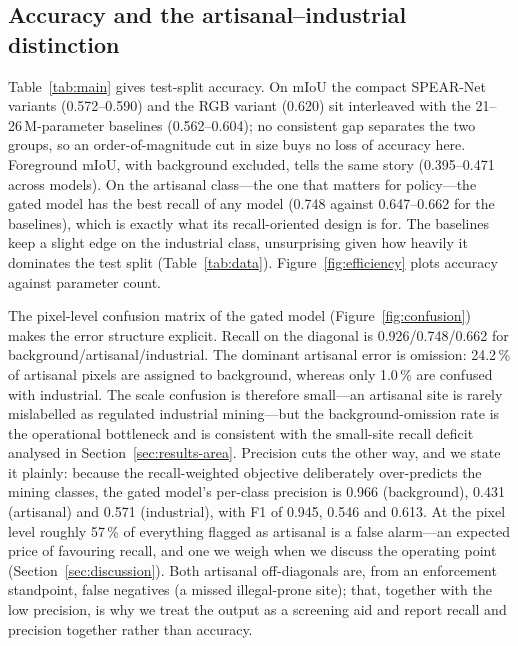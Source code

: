 \documentclass[review]{elsarticle}
\begin{document}
\subsection{Accuracy and the artisanal--industrial distinction}\label{sec:results-main}
Table~\ref{tab:main} gives test-split accuracy. On mIoU the compact SPEAR-Net variants
(\num{0.572}--\num{0.590}) and the RGB variant (\num{0.620}) sit interleaved with the
\num{21}--\num{26}\,M-parameter baselines (\num{0.562}--\num{0.604}); no consistent gap
separates the two groups, so an order-of-magnitude cut in size buys no loss of accuracy
here. Foreground mIoU, with background excluded, tells the same story (\num{0.395}--\num{0.471}
across models). On the artisanal class---the one that matters for policy---the gated model
has the best recall of any model (\num{0.748} against \num{0.647}--\num{0.662} for the
baselines), which is exactly what its recall-oriented design is for. The baselines keep a
slight edge on the industrial class, unsurprising given how heavily it dominates the test
split (Table~\ref{tab:data}). Figure~\ref{fig:efficiency} plots accuracy against parameter
count.

The pixel-level confusion matrix of the gated model (Figure~\ref{fig:confusion}) makes the
error structure explicit. Recall on the diagonal is \num{0.926}/\num{0.748}/\num{0.662} for
background/artisanal/industrial. The dominant artisanal error is omission: \num{24.2}\,\% of
artisanal pixels are assigned to background, whereas only \num{1.0}\,\% are confused with
industrial. The scale confusion is therefore small---an artisanal site is rarely mislabelled
as regulated industrial mining---but the background-omission rate is the operational
bottleneck and is consistent with the small-site recall deficit analysed in
Section~\ref{sec:results-area}. Precision cuts the other way, and we state it plainly:
because the recall-weighted objective deliberately over-predicts the mining classes, the
gated model's per-class precision is \num{0.966} (background), \num{0.431} (artisanal) and
\num{0.571} (industrial), with F1 of \num{0.945}, \num{0.546} and \num{0.613}. At the pixel
level roughly \num{57}\,\% of everything flagged as artisanal is a false alarm---an expected
price of favouring recall, and one we weigh when we discuss the operating point
(Section~\ref{sec:discussion}). Both artisanal off-diagonals are, from an enforcement
standpoint, false negatives (a missed illegal-prone site); that, together with the low
precision, is why we treat the output as a screening aid and report recall and precision
together rather than accuracy.
\end{document}

